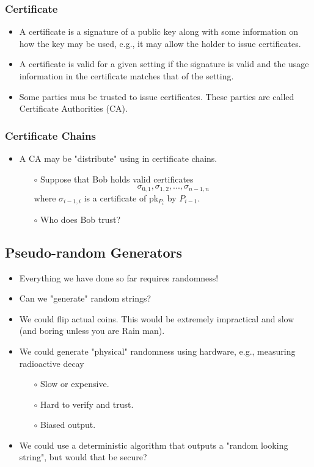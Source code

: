 \documentclass[a4paper]{scrartcl}
\begin{document}
\subsubsection*{Certificate}

\begin{itemize}
\item A certificate is a signature of a public key along with some information on how the key may be used, e.g., it may allow the holder to issue certificates.
\item A certificate is valid for a given setting if the signature is valid and the usage information in the certificate matches that of the setting.
\item Some parties mus be trusted to issue certificates. These parties are called Certificate Authorities (CA).
\end{itemize}

\subsubsection*{Certificate Chains}

\begin{itemize}
\item A CA may be "distribute" using in certificate chains.
\begin{itemize}
\item [$\circ$] Suppose that Bob holds valid certificates $$\sigma_{0,1}, \sigma_{1,2}, ...,  \sigma_{n-1,n}$$ where $\sigma_{i-1,i}$ is a certificate of pk$_{P_i}$ by $P_{i-1}$.
\item [$\circ$] Who does Bob trust?
\end{itemize}
\end{itemize}

\subsection*{Pseudo-random Generators}

\begin{itemize}
\item Everything we have done so far requires randomness!
\item Can we "generate" random strings?
\item We could flip actual coins. This would be extremely impractical and slow (and boring unless you are Rain man).
\item We could generate "physical" randomness using hardware, e.g., measuring radioactive decay
\begin{itemize}
\item [$\circ$] Slow or expensive.
\item [$\circ$] Hard to verify and trust.
\item [$\circ$] Biased output.
\end{itemize}
\item We could use a deterministic algorithm that outputs a "random looking string", but would that be secure?
\end{itemize}
\end{document}
